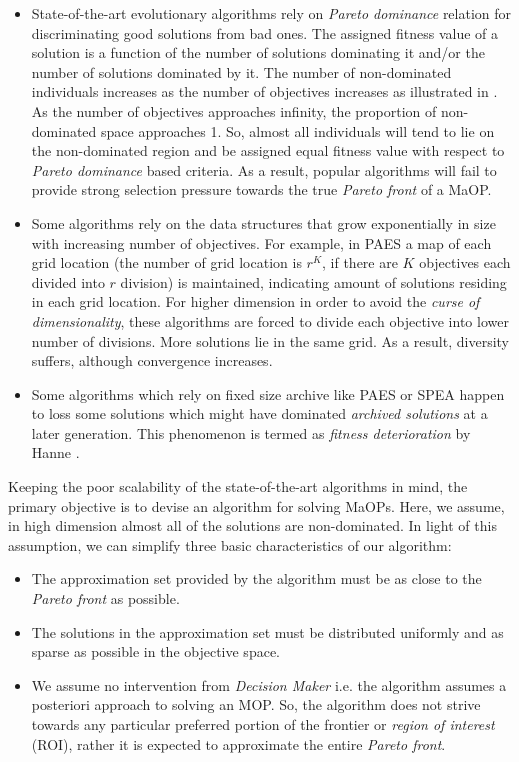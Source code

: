 \documentclass[journal]{IEEEtran}
\begin{document}
\begin{itemize}

\item State-of-the-art evolutionary algorithms rely on \textit{Pareto dominance} relation for discriminating good solutions from bad ones. The assigned fitness value of a solution is a function of the number of solutions dominating it and/or the number of solutions dominated by it. The number of non-dominated individuals increases as the number of objectives increases as illustrated in \cite{farina2003fuzzy}. As the number of objectives approaches infinity, the proportion of non-dominated space approaches 1. So, almost all individuals will tend to lie on the non-dominated region and be assigned equal fitness value with respect to \textit{Pareto dominance} based criteria. As a result, popular algorithms will fail to provide strong selection pressure towards the true \textit{Pareto front} of a MaOP.

\item Some algorithms rely on the data structures that grow exponentially in size with increasing number of objectives. For example, in PAES \cite{knowles1999pareto} a map of each grid location (the number of grid location is $r^K$, if there are $K$ objectives each divided into $r$ division) is maintained, indicating amount of solutions residing in each grid location. For higher dimension in order to avoid the \textit{curse of dimensionality}, these algorithms are forced to divide each objective into lower number of divisions. More solutions lie in the same grid. As a result, diversity suffers, although convergence increases.

\item Some algorithms which rely on fixed size archive like PAES or SPEA happen to loss some solutions which might have dominated \textit{archived solutions} at a later generation. This phenomenon is termed as \textit{fitness deterioration} by Hanne \cite{hanne1999convergence}.


\end{itemize}

Keeping the poor scalability of the state-of-the-art algorithms in mind, the primary objective is to devise an algorithm for solving MaOPs. Here, we assume, in high dimension almost all of the solutions are non-dominated. In light of this assumption, we can simplify three basic characteristics of our algorithm:

\begin{itemize}
\item The approximation set provided by the algorithm must be as close to the \textit{Pareto front} as possible.
\item The solutions in the approximation set must be distributed uniformly and as sparse as possible in the objective space.
\item We assume no intervention from \textit{Decision Maker} i.e. the algorithm assumes a posteriori approach to solving an MOP. So, the algorithm does not strive towards any particular preferred portion of the frontier or \textit{region of interest} (ROI), rather it is expected to approximate the entire \textit{Pareto front}.
\end{itemize}
\end{document}
